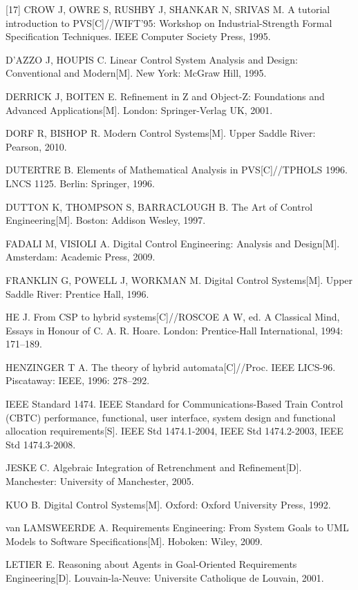 {{[17] CROW J, OWRE S, RUSHBY J, SHANKAR N, SRIVAS M. A tutorial introduction to PVS[C]//WIFT'95: Workshop on Industrial-Strength Formal Specification Techniques. IEEE Computer Society Press, 1995.\par
[18] D'AZZO J, HOUPIS C. Linear Control System Analysis and Design: Conventional and Modern[M]. New York: McGraw Hill, 1995.\par
[19] DERRICK J, BOITEN E. Refinement in Z and Object-Z: Foundations and Advanced Applications[M]. London: Springer-Verlag UK, 2001.\par
[20] DORF R, BISHOP R. Modern Control Systems[M]. Upper Saddle River: Pearson, 2010.\par
[21] DUTERTRE B. Elements of Mathematical Analysis in PVS[C]//TPHOLS 1996. LNCS 1125. Berlin: Springer, 1996.\par
[22] DUTTON K, THOMPSON S, BARRACLOUGH B. The Art of Control Engineering[M]. Boston: Addison Wesley, 1997.\par
[23] FADALI M, VISIOLI A. Digital Control Engineering: Analysis and Design[M]. Amsterdam: Academic Press, 2009.\par
[24] FRANKLIN G, POWELL J, WORKMAN M. Digital Control Systems[M]. Upper Saddle River: Prentice Hall, 1996.\par
[25] HE J. From CSP to hybrid systems[C]//ROSCOE A W, ed. A Classical Mind, Essays in Honour of C. A. R. Hoare. London: Prentice-Hall International, 1994: 171--189.\par
[26] HENZINGER T A. The theory of hybrid automata[C]//Proc. IEEE LICS-96. Piscataway: IEEE, 1996: 278--292.\par
[27] IEEE Standard 1474. IEEE Standard for Communications-Based Train Control (CBTC) performance, functional, user interface, system design and functional allocation requirements[S]. IEEE Std 1474.1-2004, IEEE Std 1474.2-2003, IEEE Std 1474.3-2008.\par
[28] JESKE C. Algebraic Integration of Retrenchment and Refinement[D]. Manchester: University of Manchester, 2005.\par
[29] KUO B. Digital Control Systems[M]. Oxford: Oxford University Press, 1992.\par
[30] van LAMSWEERDE A. Requirements Engineering: From System Goals to UML Models to Software Specifications[M]. Hoboken: Wiley, 2009.\par
[31] LETIER E. Reasoning about Agents in Goal-Oriented Requirements Engineering[D]. Louvain-la-Neuve: Universite Catholique de Louvain, 2001.\par
}}
